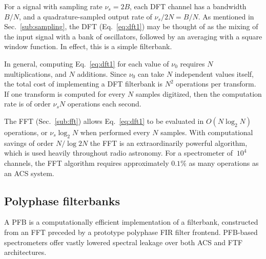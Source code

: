 \documentclass{ws-rv961x669}
\begin{document}
For a signal with sampling rate $\nu_s=2B$, each DFT channel has a bandwidth $B/N$, and a quadrature-sampled output rate of $\nu_s/2N = B/N$. As mentioned in Sec.~\ref{sub:sampling}, the DFT (Eq.~\ref{eq:dft1}) may be thought of as the mixing of the input signal with a bank of oscillators, followed by an averaging with a square window function. In effect, this is a simple filterbank. 


In general, computing Eq.~\ref{eq:dft1} for each value of $\nu_0$ requires $N$ multiplications, and $N$ additions. Since $\nu_0$ can take $N$ independent values itself, the total cost of implementing a DFT filterbank is $N^2$ operations per transform. If one transform is computed for every $N$ samples digitized, then the computation rate is of order $\nu_sN$ operations each second. 

The FFT (Sec.~\ref{sub:fft}) allows Eq.~\ref{eq:dft1} to be evaluated in $O(N\log_2N)$ operations, or $\nu_s\log_2N$ when performed every $N$ samples. With computational savings of order $N / \log2{N}$ the FFT is an extraordinarily powerful algorithm, which is used heavily throughout radio astronomy. For a spectrometer of $~10^4$ channels, the FFT algorithm requires approximately $0.1\%$ as many operations as an ACS system.


\subsection{Polyphase filterbanks}\label{sub:pfb}

A PFB is a computationally efficient implementation of a filterbank, constructed from an FFT preceded by a prototype polyphase FIR filter frontend.\citet{Bellanger:1976p7898, Harris2011} PFB-based spectrometers offer vastly lowered spectral leakage over both ACS and FTF architectures. 
\end{document}
